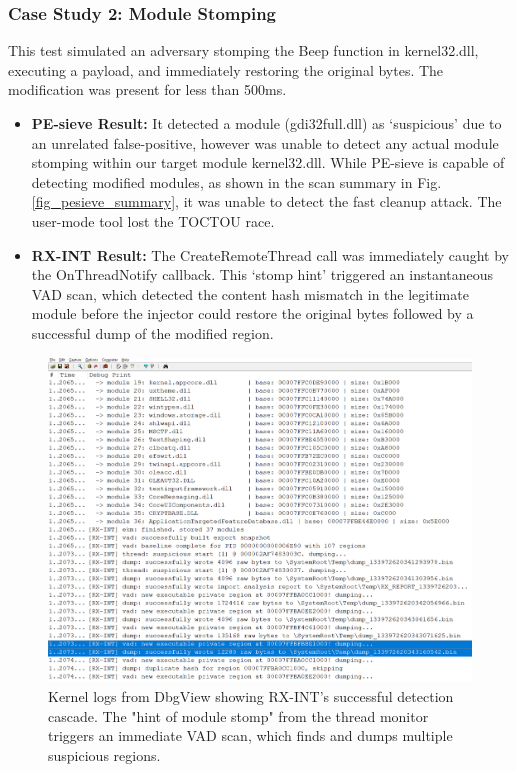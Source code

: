 \documentclass[journal]{IEEEtran}
\begin{document}
\subsubsection{Case Study 2: Module Stomping}
This test simulated an adversary stomping the Beep function in kernel32.dll, executing a payload, and immediately restoring the original bytes. The modification was present for less than 500ms.
\begin{itemize}
\item \textbf{PE-sieve Result:} It detected a module (gdi32full.dll) as `suspicious' due to an unrelated false-positive, however was unable to detect any actual module stomping within our target module kernel32.dll. While PE-sieve is capable of detecting modified modules, as shown in the scan summary in Fig. \ref{fig_pesieve_summary}, it was unable to detect the fast cleanup attack. The user-mode tool lost the TOCTOU race.
\item \textbf{RX-INT Result:} The CreateRemoteThread call was immediately caught by the OnThreadNotify callback. This `stomp hint' triggered an instantaneous VAD scan, which detected the content hash mismatch in the legitimate module before the injector could restore the original bytes followed by a successful dump of the modified region.
\end{itemize}
\begin{figure}[!t]
\centering
\includegraphics[width=\columnwidth]{figures/dbgview_logs.png}
\caption{Kernel logs from DbgView showing RX-INT's successful detection cascade. The "hint of module stomp" from the thread monitor triggers an immediate VAD scan, which finds and dumps multiple suspicious regions.}
\label{fig_dbgview}
\end{figure}
\end{document}
